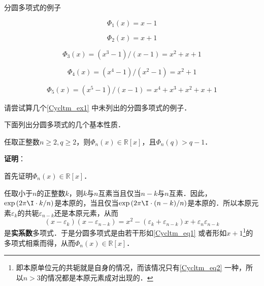 \begin{example}{分圆多项式的例子}\label{Cycltm_ex1}

\begin{equation}
\Phi_1(x) = x-1
\end{equation}

\begin{equation}\label{Cycltm_eq2}
\Phi_2(x) = x+1
\end{equation}

\begin{equation}
\Phi_3(x) = (x^3-1)/(x-1) = x^2+x+1
\end{equation}

\begin{equation}
\Phi_4(x) = (x^4-1)/(x^2-1) = x^2+1
\end{equation}

\begin{equation}
\Phi_5(x) = (x^5-1)/(x-1) = x^4+x^3+x^2+x+1
\end{equation}


\end{example}

\begin{exercise}{}
请尝试算几个\autoref{Cycltm_ex1} 中未列出的分圆多项式的例子．
\end{exercise}

下面列出分圆多项式的几个基本性质．

\begin{theorem}{}
任取正整数$n\geq 2, q\geq 2$，则$\Phi_n(x)\in\mathbb{R}[x]$，且$\Phi_n(q)>q-1$．
\end{theorem}

\textbf{证明}：

首先证明$\Phi_n(x)\in\mathbb{R}[x]$．

任取小于$n$的正整数$k$，则$k$与$n$互素当且仅当$n-k$与$n$互素．因此，$\exp{(2\pi\I\cdot  k/n)}$是本原的，当且仅当$\exp{(2\pi\I\cdot  (n-k)/n)}$是本原的．所以本原元素$\varepsilon_k$的共轭$\varepsilon_{n-k}$还是本原元素，从而
\begin{equation}\label{Cycltm_eq1}
(x-\varepsilon_k)(x-\varepsilon_{n-k})=x^2-(\varepsilon_k+\varepsilon_{n-k})x+\varepsilon_n\varepsilon_{n-k}
\end{equation}
是\textbf{实系数}多项式．于是分圆多项式是由若干形如\autoref{Cycltm_eq1} 或者形如$x+1$\footnote{即本原单位元的共轭就是自身的情况，而该情况只有\autoref{Cycltm_eq2} 一种，所以$n>3$的情况都是本原元素成对出现的．}的多项式相乘而得，从而$\Phi_n(x)\in\mathbb{R}[x]$．

